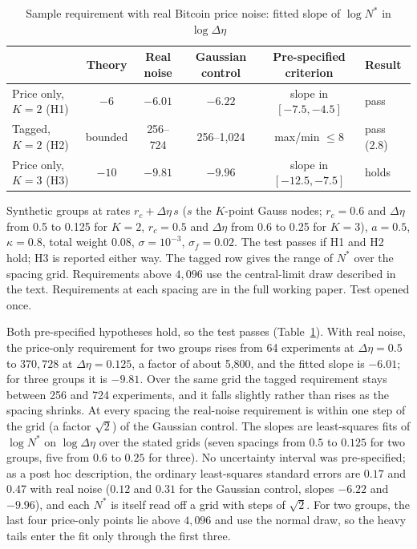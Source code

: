 \documentclass[12pt]{article}
\theoremstyle{definition}
\theoremstyle{remark}
\begin{document}
\begin{table}[t]\centering\small
\begin{threeparttable}
\caption{Sample requirement with real Bitcoin price noise: fitted slope of $\log N^*$ in $\log\Delta\eta$}\label{tab:injection}
\begin{tabular}{lccccl}
\toprule
 & Theory & Real noise & Gaussian control & Pre-specified criterion & Result\\
\midrule
Price only, $K=2$ (H1) & $-6$ & $-6.01$ & $-6.22$ & slope in $[-7.5,-4.5]$ & pass\\
Tagged, $K=2$ (H2) & bounded & 256--724 & 256--1{,}024 & max/min $\le8$ & pass (2.8)\\
Price only, $K=3$ (H3) & $-10$ & $-9.81$ & $-9.96$ & slope in $[-12.5,-7.5]$ & holds\\
\bottomrule
\end{tabular}
\begin{tablenotes}\footnotesize\item Synthetic groups at rates $r_c+\Delta\eta\,s$ ($s$ the $K$-point Gauss nodes; $r_c=0.6$ and $\Delta\eta$ from 0.5 to 0.125 for $K=2$, $r_c=0.5$ and $\Delta\eta$ from 0.6 to 0.25 for $K=3$), $a=0.5$, $\kappa=0.8$, total weight 0.08, $\sigma=10^{-3}$, $\sigma_f=0.02$. The test passes if H1 and H2 hold; H3 is reported either way. The tagged row gives the range of $N^*$ over the spacing grid. Requirements above $4{,}096$ use the central-limit draw described in the text. Requirements at each spacing are in the full working paper. Test opened once.\end{tablenotes}
\end{threeparttable}
\end{table}

Both pre-specified hypotheses hold, so the test passes (Table~\ref{tab:injection}). With real noise, the price-only requirement for two groups rises from 64 experiments at $\Delta\eta=0.5$ to $370{,}728$ at $\Delta\eta=0.125$, a factor of about 5{,}800, and the fitted slope is $-6.01$; for three groups it is $-9.81$. Over the same grid the tagged requirement stays between 256 and 724 experiments, and it falls slightly rather than rises as the spacing shrinks. At every spacing the real-noise requirement is within one step of the grid (a factor $\sqrt2$) of the Gaussian control. The slopes are least-squares fits of $\log N^*$ on $\log\Delta\eta$ over the stated grids (seven spacings from $0.5$ to $0.125$ for two groups, five from $0.6$ to $0.25$ for three). No uncertainty interval was pre-specified; as a post hoc description, the ordinary least-squares standard errors are $0.17$ and $0.47$ with real noise ($0.12$ and $0.31$ for the Gaussian control, slopes $-6.22$ and $-9.96$), and each $N^*$ is itself read off a grid with steps of $\sqrt2$. For two groups, the last four price-only points lie above $4{,}096$ and use the normal draw, so the heavy tails enter the fit only through the first three.
\end{document}
